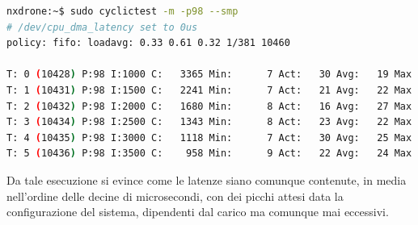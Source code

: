 \begin{lstlisting}[language=bash, caption=Esempio di benchmark del SoC montato sul drone eseguito con la utility \emph{cyclictest}.]
nxdrone:~$ sudo cyclictest -m -p98 --smp
# /dev/cpu_dma_latency set to 0us
policy: fifo: loadavg: 0.33 0.61 0.32 1/381 10460          

T: 0 (10428) P:98 I:1000 C:   3365 Min:      7 Act:   30 Avg:   19 Max:     147
T: 1 (10431) P:98 I:1500 C:   2241 Min:      7 Act:   21 Avg:   22 Max:     294
T: 2 (10432) P:98 I:2000 C:   1680 Min:      8 Act:   16 Avg:   27 Max:     352
T: 3 (10434) P:98 I:2500 C:   1343 Min:      8 Act:   23 Avg:   22 Max:     155
T: 4 (10435) P:98 I:3000 C:   1118 Min:      7 Act:   30 Avg:   25 Max:     147
T: 5 (10436) P:98 I:3500 C:    958 Min:      9 Act:   22 Avg:   24 Max:     319
\end{lstlisting}

Da tale esecuzione si evince come le latenze siano comunque contenute, in media nell'ordine delle decine di microsecondi, con dei picchi attesi data la configurazione del sistema, dipendenti dal carico ma comunque mai eccessivi.
\clearpage

